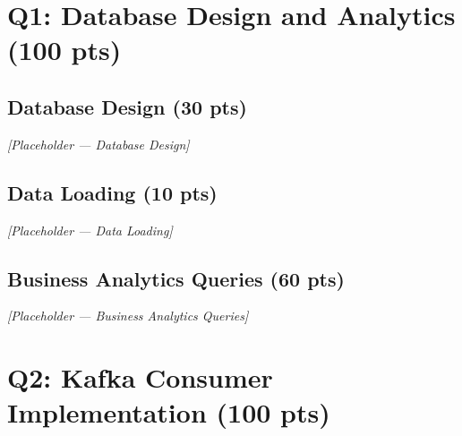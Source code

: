 \documentclass[a4paper,12pt]{extarticle}
\begin{document}
\section{Q1: Database Design and Analytics (100 pts)}

\subsection{Database Design (30 pts)}


\textit{[Placeholder — Database Design]}

\subsection{Data Loading (10 pts)}


\textit{[Placeholder — Data Loading]}

\subsection{Business Analytics Queries (60 pts)}


\textit{[Placeholder — Business Analytics Queries]}

\section{Q2: Kafka Consumer Implementation (100 pts)}
\end{document}
